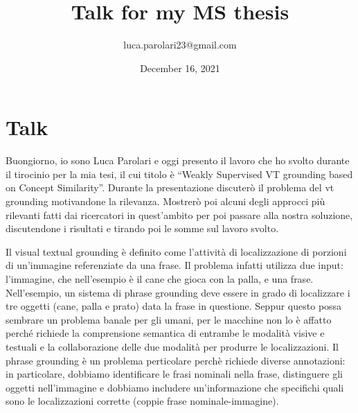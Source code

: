 \documentclass{article}
\title{Talk for my MS thesis}
\author{luca.parolari23@gmail.com}
\date{December 16, 2021}
\begin{document}
\maketitle

\section{Talk}

Buongiorno, io sono Luca Parolari e oggi presento il lavoro che ho
svolto durante il tirocinio per la mia tesi, il cui titolo è ``Weakly
Supervised VT grounding based on Concept Similarity''. Durante la
presentazione discuterò il problema del vt grounding motivandone la
rilevanza. Mostrerò poi alcuni degli approcci più rilevanti fatti dai
ricercatori in quest'ambito per poi passare alla nostra soluzione,
discutendone i risultati e tirando poi le somme sul lavoro svolto.

Il visual textual grounding è definito come l'attività di
localizzazione di porzioni di un'immagine referenziate da una frase.
Il problema infatti utilizza due input: l'immagine, che nell'esempio è
il cane che gioca con la palla, e una frase. Nell'esempio, un sistema
di phrase grounding deve essere in grado di localizzare i tre oggetti
(cane, palla e prato) data la frase in questione. Seppur questo possa
sembrare un problema banale per gli umani, per le macchine non lo è
affatto perché richiede la comprensione semantica di entrambe le
modalità visive e testuali e la collaborazione delle due modalità per
produrre le localizzazioni. Il phrase grounding è un problema
perticolare perchè richiede diverse annotazioni: in particolare,
dobbiamo identificare le frasi nominali nella frase, distinguere gli
oggetti nell'immagine e dobbiamo includere un'informazione che
specifichi quali sono le localizzazioni corrette (coppie frase
nominale-immagine).

\end{document}
